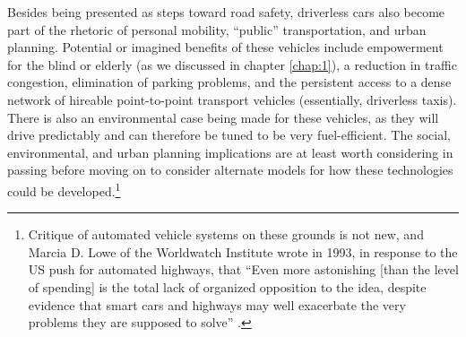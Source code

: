 Besides being presented as steps toward road safety, driverless cars
also become part of the rhetoric of personal mobility, ``public''
transportation, and urban planning. Potential or imagined
benefits of these vehicles include empowerment for the blind or
elderly (as we discussed in chapter \ref{chap:1}), a reduction in
traffic congestion, elimination of parking problems, and the
persistent access to a dense network of hireable point-to-point
transport vehicles (essentially, driverless taxis). There is
  also an environmental case being made for these vehicles, as they
  will drive predictably and can therefore be tuned to be very
  fuel-efficient. The social, environmental, and urban planning
implications are at least worth considering in passing before moving
on to consider alternate models for how these technologies could be
developed.\footnote{Critique of automated vehicle systems on these
  grounds is not new, and Marcia D. Lowe of the Worldwatch
    Institute wrote in 1993, in response to
the US push for automated highways, that ``Even more astonishing [than
  the level of spending] is
the total lack of organized opposition to the idea, despite evidence
that smart cars and highways may well exacerbate the very problems
they are supposed to solve'' \cite{novakNationalAutomated}.}

